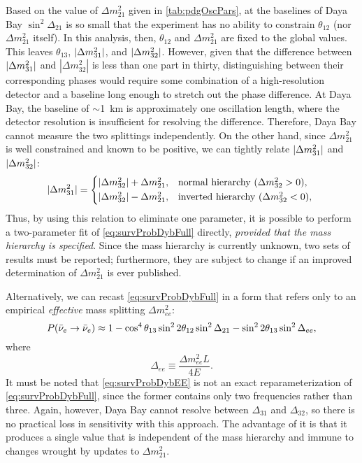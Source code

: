 \documentclass[../thesis.tex]{subfiles}
\begin{document}
Based on the value of $\Delta m^2_{21}$ given in \autoref{tab:pdgOscPars}, at the baselines of Daya Bay \(\sin^2 \Delta_{21}\) is so small that the experiment has no ability to constrain $\theta_{12}$ (nor \(\Delta m^2_{21}\) itself). In this analysis, then, $\theta_{12}$ and $\Delta m^2_{21}$ are fixed to the global values. This leaves $\theta_{13}$, \(\lvert \Delta m^2_{31}\rvert\), and \(\lvert \Delta m^2_{32}\rvert\). However, given that the difference between \(\lvert \Delta m^2_{31}\rvert\) and \(|\Delta m^2_{32}|\) is less than one part in thirty, distinguishing between their corresponding phases would require some combination of a high-resolution detector and a baseline long enough to stretch out the phase difference. At Daya Bay, the baseline of $\sim$1~km is approximately one oscillation length, where the detector resolution is insufficient for resolving the difference. Therefore, Daya Bay cannot measure the two splittings independently. On the other hand, since \(\Delta m^2_{21}\) is well constrained and known to be positive, we can tightly relate \(\lvert \Delta m^2_{31}\rvert\) and \(\lvert \Delta m^2_{32}\rvert\):
\begin{equation}
  \label{eq:hierarchy}
  \abs{\Delta m^2_{31}} =
  \begin{cases*}
    \abs{\Delta m^2_{32}} + \Delta m^2_{21}, & normal hierarchy ($\Delta m^2_{32} > 0$), \\
    \abs{\Delta m^2_{32}} - \Delta m^2_{21}, & inverted hierarchy ($\Delta m^2_{32} < 0$), \\
  \end{cases*}
\end{equation}
Thus, by using this relation to eliminate one parameter, it is possible to perform a two-parameter fit of \eqref{eq:survProbDybFull} directly, \emph{provided that the mass hierarchy is specified}. Since the mass hierarchy is currently unknown, two sets of results must be reported; furthermore, they are subject to change if an improved determination of \(\Delta m^2_{21}\) is ever published.

Alternatively, we can recast \eqref{eq:survProbDybFull} in a form that refers only to an empirical \emph{effective} mass splitting \(\Delta m^2_{ee}\):
\begin{equation}
  \label{eq:survProbDybEE}
  P(\bar\nu_e \rightarrow \bar\nu_e) \approx 1 - \cos^4\theta_{13}\sin^2 2\theta_{12} \sin^2 \Delta_{21}
  - \sin^2 2\theta_{13}\sin^2\Delta_{ee},
\end{equation}
where
\begin{equation}
  \Delta_{ee} \equiv \frac{\Delta m^2_{ee}L}{4E}. 
\end{equation}
It must be noted that \eqref{eq:survProbDybEE} is not an exact reparameterization of \eqref{eq:survProbDybFull}, since the former contains only two frequencies rather than three. Again, however, Daya Bay cannot resolve between $\Delta_{31}$ and $\Delta_{32}$, so there is no practical loss in sensitivity with this approach. The advantage of it is that it produces a single value that is independent of the mass hierarchy and immune to changes wrought by updates to \(\Delta m^2_{21}\).
\end{document}

